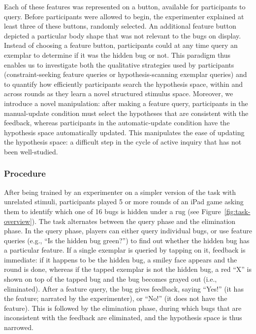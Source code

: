 \documentclass[10pt,letterpaper]{article}
\begin{document}
Each of these features was represented on a button, available for participants to query. Before 
participants were allowed to begin, the experimenter explained at least three of 
these buttons, randomly selected. An additional feature button depicted a particular 
body shape that was not relevant to the bugs on display. Instead of choosing a feature button, participants could at any time query an exemplar to determine if it was the hidden bug or not. This paradigm thus enables us to investigate both the qualitative strategies used by participants (constraint-seeking feature queries or hypothesis-scanning exemplar queries) and to quantify how efficiently participants search the hypothesis space, within and across rounds as they learn a novel structured stimulus space. Moreover, we introduce a novel manipulation: after making a feature query, participants in the manual-update condition must select the hypotheses that are consistent with the feedback, whereas participants in the automatic-update condition have the hypothesis space automatically updated. This manipulates the ease of updating the hypothesis space: a difficult step in the cycle of active inquiry that has not been well-studied. 

\subsubsection{Procedure}

After being trained by an experimenter on a simpler version of the task with 
unrelated stimuli, participants played 5 or more 
rounds of an iPad game asking them to identify which one of 16 bugs is hidden 
under a rug (see Figure~\ref{fig:task-overview}). The task alternates between the 
query phase and the elimination phase. In the query phase, players can either query 
individual bugs, or use feature queries (e.g., ``Is the hidden bug green?'') to find out 
whether the hidden bug has a particular feature. If a single exemplar is queried by 
tapping on it, feedback is immediate: if it happens to be the hidden bug, a smiley 
face appears and the round is done, whereas if the tapped exemplar is not the 
hidden bug, a red ``X'' is shown on top of the tapped bug and the bug becomes 
grayed out (i.e., eliminated). After a feature query, the bug gives feedback, saying 
``Yes!'' (it has the feature; narrated by the experimenter), or ``No!'' (it does not have 
the feature). This is followed by the elimination phase, during which bugs that are inconsistent 
with the feedback are eliminated, and the hypothesis space is thus narrowed. 
\end{document}
